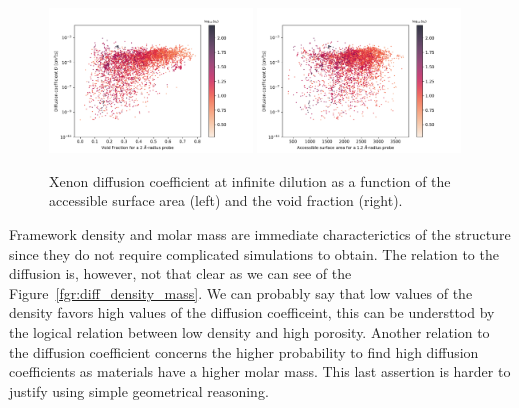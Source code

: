 \documentclass[main]{subfiles}
\begin{document}
\begin{figure}[ht]
  \centering
    \includegraphics[width=0.48\textwidth]{figures/5-diffusion/D_log-vf_2_s_+.pdf}
    \includegraphics[width=0.48\textwidth]{figures/5-diffusion/D_log-sa_12_s_+.pdf}
    \caption{Xenon diffusion coefficient at infinite dilution as a function of the accessible surface area (left) and the void fraction (right). }\label{fgr:diff_sa_vf}
\end{figure}

Framework density and molar mass are immediate characterictics of the structure since they do not require complicated simulations to obtain. The relation to the diffusion is, however, not that clear as we can see of the Figure~\ref{fgr:diff_density_mass}. We can probably say that low values of the density favors high values of the diffusion coefficeint, this can be understtod by the logical relation between low density and high porosity. Another relation to the diffusion coefficient concerns the higher probability to find high diffusion coefficients as materials have a higher molar mass. This last assertion is harder to justify using simple geometrical reasoning. 
\end{document}
